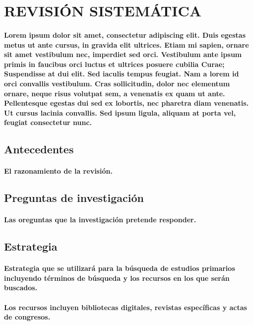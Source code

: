 \documentclass[10pt, twocolumn]{article}
\begin{document}
\section{REVISIÓN SISTEMÁTICA}
\paragraph{Lorem ipsum dolor sit amet, consectetur adipiscing elit. Duis egestas metus ut ante cursus, in gravida elit ultrices. Etiam mi sapien, ornare sit amet vestibulum nec, imperdiet sed orci. Vestibulum ante ipsum primis in faucibus orci luctus et ultrices posuere cubilia Curae; Suspendisse at dui elit. Sed iaculis tempus feugiat. Nam a lorem id orci convallis vestibulum. Cras sollicitudin, dolor nec elementum ornare, neque risus volutpat sem, a venenatis ex quam ut ante. Pellentesque egestas dui sed ex lobortis, nec pharetra diam venenatis. Ut cursus lacinia convallis. Sed ipsum ligula, aliquam at porta vel, feugiat consectetur nunc.}

\subsection{Antecedentes}
\paragraph{El razonamiento de la revisión.}

\subsection{Preguntas de investigación}
\paragraph{Las oreguntas que la investigación pretende responder.}

\subsection{Estrategia}
\paragraph{Estrategia que se utilizará para la búsqueda de estudios primarios incluyendo términos de búsqueda y los recursos en los que serán buscados.}
\paragraph{Los recursos incluyen bibliotecas digitales, revistas específicas y actas de congresos.}
\end{document}

